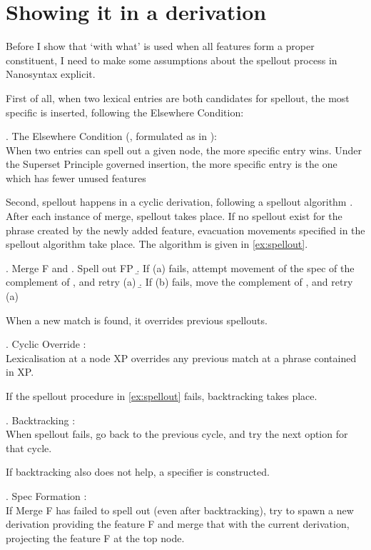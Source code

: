 \documentclass[12pt]{article}
\begin{document}
\section{Showing it in a derivation}

Before I show that  `with what' is used when all features form a proper constituent, I need to make some assumptions about the spellout process in Nanosyntax explicit.

First of all, when two lexical entries are both candidates for spellout, the most specific is inserted, following the Elsewhere Condition:

\ex. The Elsewhere Condition (\citealt{kiparsky1973}, formulated as in \citealt{caha2020}):\\
When two entries can spell out a given node, the more specific entry wins. Under the Superset Principle governed insertion, the more specific entry is the one which has fewer unused features

Second, spellout happens in a cyclic derivation, following a spellout algorithm \citep{starke2018}. After each instance of merge, spellout takes place. If no spellout exist for the phrase created by the newly added feature, evacuation movements specified in the spellout algorithm take place. The algorithm is given in \ref{ex:spellout}.

\ex. Merge F and \label{ex:spellout}
 \a. Spell out FP
 \b. If (a) fails, attempt movement of the spec of the complement of , and retry (a)
 \b. If (b) fails, move the complement of , and retry (a)

When a new match is found, it overrides previous spellouts.

\ex. Cyclic Override \citep{starke2018}:\\
Lexicalisation at a node XP overrides any previous match at a phrase contained in XP.

If the spellout procedure in \ref{ex:spellout} fails, backtracking takes place.

\ex. Backtracking \citep{starke2018}:\\
When spellout fails, go back to the previous cycle, and try the next option for that cycle.

If backtracking also does not help, a specifier is constructed.

\ex. Spec Formation \citep{starke2018}:\\
If Merge F has failed to spell out (even after backtracking), try to spawn a new derivation providing the feature F and merge that with the current derivation, projecting the feature F at the top node.
\end{document}
